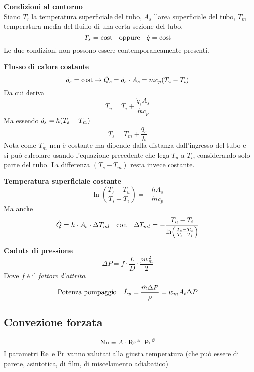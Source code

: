 \textbf{Condizioni al contorno}\\
Siano $T_s$ la temperatura superficiale del tubo, $A_s$ l'area superficiale del tubo, $T_m$ temperatura media del fluido di una certa sezione del tubo.
\[ T_s = \text{cost} \qq{oppure} \dot{q} = \text{cost} \]
Le due condizioni non possono essere contemporaneamente presenti.

\textbf{Flusso di calore costante}\\
\[ \dot{q}_s = \text{cost} \rightarrow \dot{Q}_s = \dot{q}_s \cdot A_s = \dot{m} c_p \qty(T_u - T_i) \]
Da cui deriva 
\[ T_u = T_i + \frac{\dot{q}_s A_s}{\dot{m} c_p} \]
Ma essendo $\dot{q}_s = h \qty(T_s - T_m)$
\[ T_s = T_m + \frac{\dot{q}_s}{h} \]
Nota come $T_m$ non è costante ma dipende dalla distanza dall'ingresso del tubo e si può calcolare usando l'equazione precedente che lega $T_u$ a $T_i$, considerando solo parte del tubo.
La differenza $(T_s - T_m)$ resta invece costante.

\textbf{Temperatura superficiale costante}\\
\[ \ln(\frac{T_s - T_u}{T_s - T_i}) = - \frac{h A_s}{\dot{m} c_p} \]
Ma anche
\[ \dot{Q} = h \cdot A_s \cdot \Delta T_{ml} \qq{con} \Delta T_{ml} = - \frac{T_u - T_i}{\ln(\frac{T_s - T_u}{T_s - T_i})} \]

\textbf{Caduta di pressione}\\
\[ \Delta P = f \cdot \frac{L}{D} \cdot \frac{\rho w_m^2}{2} \]
Dove $f$ è il \emph{fattore d'attrito}.
\[ \qq*{Potenza pompaggio} \dot{L}_p = \frac{\dot{m} \Delta P}{\rho} = w_m A_t \Delta P \]

\subsection{Convezione forzata}
\[ \operatorname{Nu} = A \cdot \operatorname{Re}^\alpha \cdot \operatorname{Pr}^\beta \]
I parametri $\operatorname{Re}$ e $\operatorname{Pr}$ vanno valutati alla giusta temperatura (che può essere di parete, asintotica, di film, di miscelamento adiabatico).

